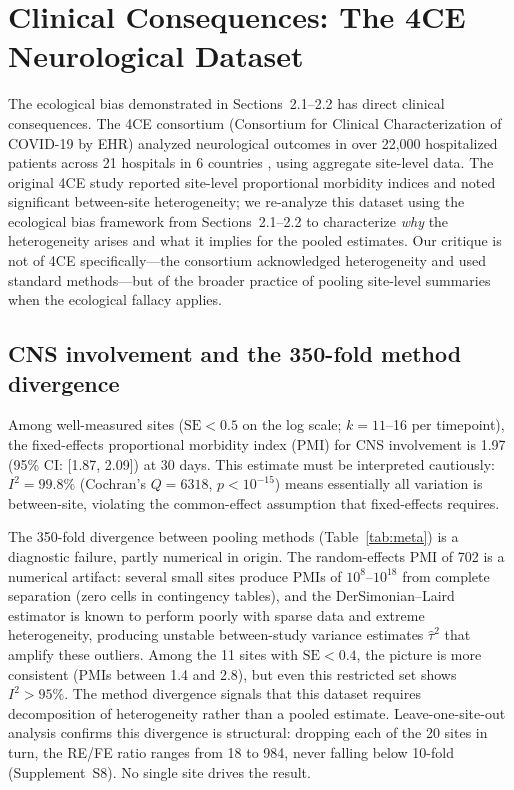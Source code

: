 \documentclass[11pt]{article}
\begin{document}
\section{Clinical Consequences: The 4CE Neurological Dataset}

The ecological bias demonstrated in Sections~2.1--2.2 has direct clinical
consequences.  The 4CE consortium (Consortium for Clinical Characterization
of COVID-19 by EHR) analyzed neurological outcomes in over 22,000
hospitalized patients across 21 hospitals in 6 countries
\cite{four_ce_neuro2021}, using aggregate site-level data.  The original
4CE study reported site-level proportional morbidity indices and noted
significant between-site heterogeneity; we re-analyze this dataset
using the ecological bias framework from Sections~2.1--2.2 to characterize
\emph{why} the heterogeneity arises and what it implies for the pooled
estimates.  Our critique is not of 4CE specifically---the consortium
acknowledged heterogeneity and used standard methods---but of the broader
practice of pooling site-level summaries when the ecological fallacy applies.


\subsection{CNS involvement and the 350-fold method divergence}

Among well-measured sites ($\text{SE} < 0.5$ on the log scale; $k = 11$--16
per timepoint), the fixed-effects proportional morbidity index (PMI) for CNS
involvement is 1.97 (95\% CI: [1.87, 2.09]) at 30 days.  This estimate must
be interpreted cautiously: $I^2 = 99.8\%$ (Cochran's $Q = 6318$, $p <
10^{-15}$) means essentially all variation is between-site, violating the
common-effect assumption that fixed-effects requires.

The 350-fold divergence between pooling methods (Table~\ref{tab:meta}) is a
diagnostic failure, partly numerical in origin.  The random-effects PMI of
702 is a numerical artifact: several small sites produce PMIs of
$10^{8}$--$10^{18}$ from complete separation (zero cells in contingency
tables), and the DerSimonian--Laird estimator is known to perform poorly
with sparse data and extreme heterogeneity, producing unstable
between-study variance estimates $\hat\tau^2$ that amplify these outliers.  Among the 11 sites with $\text{SE} < 0.4$, the picture is more
consistent (PMIs between 1.4 and 2.8), but even this restricted set shows
$I^2 > 95\%$.  The method divergence signals that this dataset requires
decomposition of heterogeneity rather than a pooled estimate.
Leave-one-site-out analysis confirms this divergence is structural:
dropping each of the 20 sites in turn, the RE/FE ratio ranges from
18 to 984, never falling below 10-fold (Supplement~S8).  No single
site drives the result.
\end{document}
